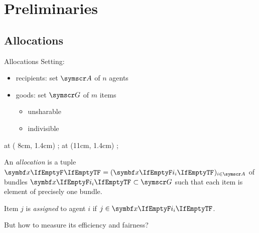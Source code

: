 \section{Preliminaries}

\subsection{Allocations}
\begin{frame}{Allocations}
	Setting:
	\begin{itemize}
		\item
		recipients: set \(\agents\) of \(n\) agents

		\item
		goods: set \(\goods\) of \(m\) items
		\begin{itemize}
			\item
			unsharable

			\item
			indivisible
		\end{itemize}
	\end{itemize}
	\beamerimage at ( 8cm, 1.4cm) {\resizebox{!}{2cm}{}};
	\beamerimage at (11cm, 1.4cm) {\resizebox{!}{2cm}{}};
	\vspace{-3ex}
	\begin{definition}
		An \emph{allocation} is a tuple
		\(\alloc[][] = (\alloc)_{i \in \agents}\)
		of bundles \(\alloc \subset \goods\) such that each item is element of precisely one bundle.

		Item \(j\) is \emph{assigned} to agent \(i\) if \(j \in \alloc\).
	\end{definition}

	But how to measure its efficiency and fairness?
\end{frame}





